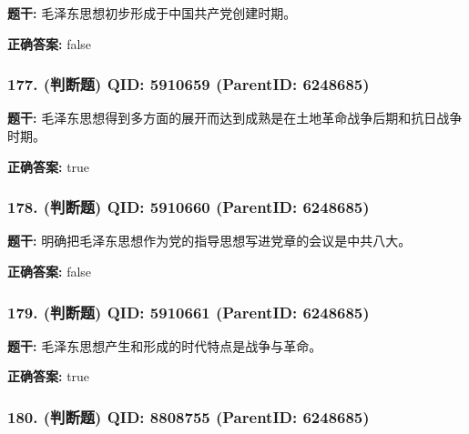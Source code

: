 \documentclass[12pt,UTF8]{ctexart}
\begin{document}
\textbf{题干:}
毛泽东思想初步形成于中国共产党创建时期。



\textbf{正确答案:}
false

\vspace{0.3em}\hrulefill\vspace{0.7em}

\subsubsection*{177. (判断题) \small QID: 5910659 (ParentID: 6248685)}

\textbf{题干:}
毛泽东思想得到多方面的展开而达到成熟是在土地革命战争后期和抗日战争时期。



\textbf{正确答案:}
true

\vspace{0.3em}\hrulefill\vspace{0.7em}

\subsubsection*{178. (判断题) \small QID: 5910660 (ParentID: 6248685)}

\textbf{题干:}
明确把毛泽东思想作为党的指导思想写进党章的会议是中共八大。



\textbf{正确答案:}
false

\vspace{0.3em}\hrulefill\vspace{0.7em}

\subsubsection*{179. (判断题) \small QID: 5910661 (ParentID: 6248685)}

\textbf{题干:}
毛泽东思想产生和形成的时代特点是战争与革命。



\textbf{正确答案:}
true

\vspace{0.3em}\hrulefill\vspace{0.7em}

\subsubsection*{180. (判断题) \small QID: 8808755 (ParentID: 6248685)}
\end{document}
